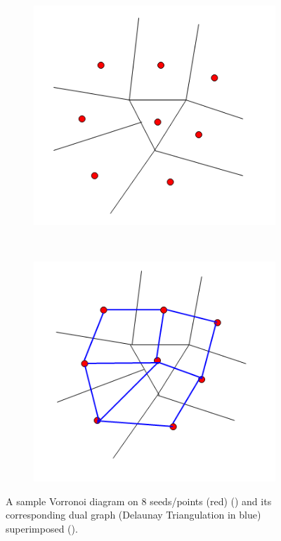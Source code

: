 \documentclass[10pt,a4paper]{article}
\begin{document}
      \begin{figure}[H]
      	\centering
      	\begin{subfigure}[b]{0.30\textwidth}
      		\includegraphics[width= \textwidth]{images/VoronoiDiagram.png}
      		\caption{}
      		\label{VoronnoiDiag}
      	\end{subfigure}~
      	\begin{subfigure}[b]{0.30\textwidth}
      		\includegraphics[width= \textwidth]{images/voronoiandDelanauy.png}
      		\caption{}
      		\label{VoronoiDelaunay}
      	\end{subfigure}
      	\caption{A sample Vorronoi diagram on $8$ seeds/points (red) () and its corresponding dual graph (Delaunay Triangulation in blue) superimposed ().}
       \end{figure}
  
\end{document}

